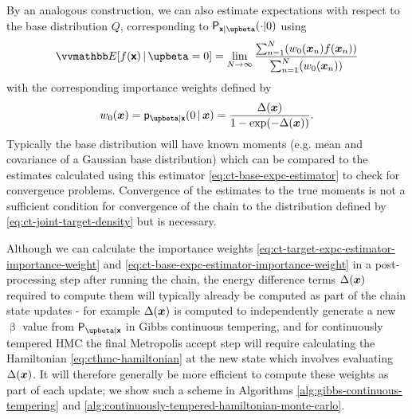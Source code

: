By an analogous construction, we can also estimate expectations with respect to the base distribution $Q$, corresponding to $\prob{\rvct{x}|\upbeta}(\cdot|0)$ using
\begin{equation}\label{eq:ct-base-expc-estimator}
\expc{f(\rvct{x})\gvn\upbeta=0}
= \lim_{N \to \infty}
\frac
{\sum_{n=1}^N \lpa w_0\lpa \vct{x}_n\rpa f\lpa\vct{x}_n\rpa\rpa}
{\sum_{n=1}^N\lpa w_0\lpa \vct{x}_n\rpa \rpa}
\end{equation}
with the corresponding importance weights defined by
\begin{equation}\label{eq:ct-base-expc-estimator-importance-weight}
w_0(\vct{x}) = \pden{\upbeta|\rvct{x}}(0 \gvn \vct{x}) = \frac{\Delta(\vct{x})}{1 - \exp\lpa - \Delta(\vct{x})\rpa}.
\end{equation}
Typically the base distribution will have known moments (e.g. mean and covariance of a Gaussian base distribution) which can be compared to the estimates calculated using this estimator \eqref{eq:ct-base-expc-estimator} to check for convergence problems. Convergence of the estimates to the true moments is not a sufficient condition for convergence of the chain to the distribution defined by \eqref{eq:ct-joint-target-density} but is necessary.

Although we can calculate the importance weights \eqref{eq:ct-target-expc-estimator-importance-weight} and \eqref{eq:ct-base-expc-estimator-importance-weight} in a post-processing step after running the chain, the energy difference terms $\Delta(\boldsymbol{x})$ required to compute them will typically already be computed as part of the chain state updates - for example $\Delta(\boldsymbol{x})$ is computed to independently generate a new $\upbeta$ value from $\prob{\upbeta|\rvct{x}}$ in Gibbs continuous tempering, and for continuously tempered \ac{HMC} the final Metropolis accept step will require calculating the Hamiltonian \eqref{eq:cthmc-hamiltonian} at the new state which involves evaluating $\Delta(\boldsymbol{x})$. It will therefore generally be more efficient to compute these weights as part of each update; we show such a scheme in Algorithms \ref{alg:gibbs-continuous-tempering} and \ref{alg:continuously-tempered-hamiltonian-monte-carlo}.

